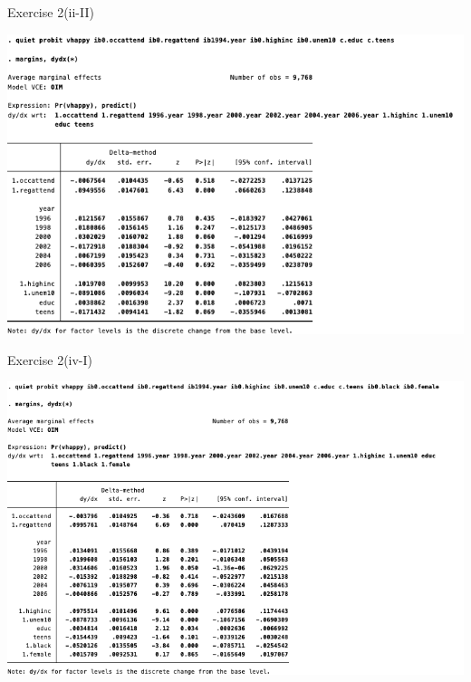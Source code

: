\documentclass[
  10pt,
  ignorenonframetext,
]{beamer}
\begin{document}
\begin{frame}{Exercise 2(ii-II)}
\protect\hypertarget{ex2-PROBIT-APE-add4ctrls}{}
\begin{center}\includegraphics[width=0.9\linewidth]{pictures/ex2-PROBIT-APE-add4ctrls} \end{center}
\end{frame}

\begin{frame}{Exercise 2(iv-I)}
\protect\hypertarget{ex2-PROBIT-APE-add6ctrls}{}
\begin{center}\includegraphics[width=0.9\linewidth]{pictures/ex2-PROBIT-APE-add6ctrls} \end{center}
\end{frame}
\end{document}
